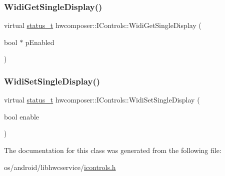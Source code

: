 \mbox{\label{classhwcomposer_1_1IControls_a69047ef7180e98e50661dc75ab8fc794}} 
\subsubsection{\texorpdfstring{Widi\+Get\+Single\+Display()}{WidiGetSingleDisplay()}}
{\footnotesize\ttfamily virtual \mbox{\hyperlink{hwcserviceapi_8h_a3806fb2027d9a316d8ca8d9b8b8eb96f}{status\+\_\+t}} hwcomposer\+::\+I\+Controls\+::\+Widi\+Get\+Single\+Display (\begin{DoxyParamCaption}\item[{bool $\ast$}]{p\+Enabled }\end{DoxyParamCaption})\hspace{0.3cm}{\ttfamily [pure virtual]}}

\mbox{\label{classhwcomposer_1_1IControls_abebb8408a1525be64b060b2af76f06f9}} 
\subsubsection{\texorpdfstring{Widi\+Set\+Single\+Display()}{WidiSetSingleDisplay()}}
{\footnotesize\ttfamily virtual \mbox{\hyperlink{hwcserviceapi_8h_a3806fb2027d9a316d8ca8d9b8b8eb96f}{status\+\_\+t}} hwcomposer\+::\+I\+Controls\+::\+Widi\+Set\+Single\+Display (\begin{DoxyParamCaption}\item[{bool}]{enable }\end{DoxyParamCaption})\hspace{0.3cm}{\ttfamily [pure virtual]}}



The documentation for this class was generated from the following file\+:\begin{DoxyCompactItemize}
\item 
os/android/libhwcservice/\mbox{\hyperlink{icontrols_8h}{icontrols.\+h}}\end{DoxyCompactItemize}
